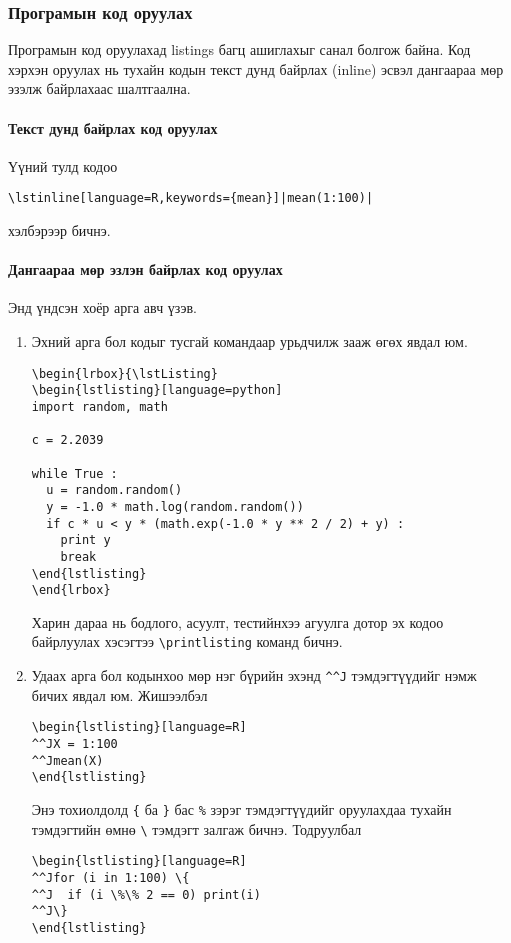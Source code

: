 \documentclass[10pt]{article}
\theoremstyle{definition}
\begin{document}
\subsubsection{Програмын код оруулах} Програмын код оруулахад listings багц ашиглахыг санал болгож байна. Код хэрхэн оруулах нь тухайн кодын текст дунд байрлах (inline) эсвэл дангаараа мөр эзэлж байрлахаас шалтгаална.

\paragraph{Текст дунд байрлах код оруулах} Үүний тулд кодоо
\begin{verbatim}
\lstinline[language=R,keywords={mean}]|mean(1:100)|
\end{verbatim}
хэлбэрээр бичнэ.

\paragraph{Дангаараа мөр эзлэн байрлах код оруулах} Энд үндсэн хоёр арга авч үзэв.
\begin{enumerate}
\item Эхний арга бол кодыг тусгай командаар урьдчилж зааж өгөх явдал юм.
\begin{verbatim}
\begin{lrbox}{\lstListing}
\begin{lstlisting}[language=python]
import random, math

c = 2.2039

while True :
  u = random.random()
  y = -1.0 * math.log(random.random())
  if c * u < y * (math.exp(-1.0 * y ** 2 / 2) + y) :
    print y
    break
\end{lstlisting}
\end{lrbox}
\end{verbatim}
Харин дараа нь бодлого, асуулт, тестийнхээ агуулга дотор эх кодоо байрлуулах хэсэгтээ \verb|\printlisting| команд бичнэ.
\item Удаах арга бол кодынхоо мөр нэг бүрийн эхэнд \verb|^^J| тэмдэгтүүдийг нэмж бичих явдал юм.
Жишээлбэл
\begin{verbatim}
\begin{lstlisting}[language=R]
^^JX = 1:100
^^Jmean(X)
\end{lstlisting}
\end{verbatim}
Энэ тохиолдолд \verb|{| ба \verb|}| бас \verb|%| зэрэг тэмдэгтүүдийг оруулахдаа тухайн тэмдэгтийн өмнө \verb|\| тэмдэгт залгаж бичнэ. Тодруулбал
\begin{verbatim}
\begin{lstlisting}[language=R]
^^Jfor (i in 1:100) \{
^^J  if (i \%\% 2 == 0) print(i)
^^J\}
\end{lstlisting}
\end{verbatim}
\end{enumerate}
\end{document}
